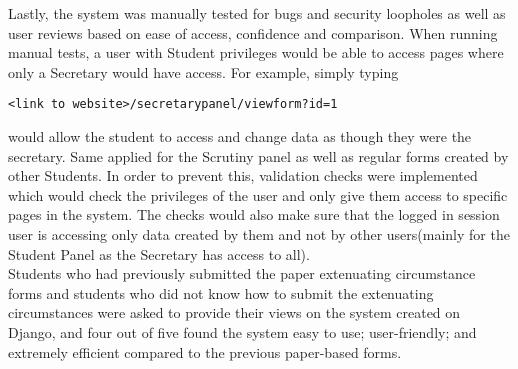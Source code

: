 \documentclass[../main.tex]{subfiles}
\begin{document}
Lastly, the system was manually tested for bugs and security loopholes as well as user reviews based on ease of access, confidence and comparison.
When running manual tests, a user with Student privileges would be able to access pages where only a Secretary would have access. For example, simply typing 
\begin{verbatim}
<link to website>/secretarypanel/viewform?id=1
\end{verbatim} 
would allow the student to access and change data as though they were the secretary. Same applied for the Scrutiny panel as well as regular forms created by other Students. In order to prevent this, validation checks were implemented which would check the privileges of the user and only give them access to specific pages in the system. The checks would also make sure that the logged in session user is accessing only data created by them and not by other users(mainly for the Student Panel as the Secretary has access to all). \\
Students who had previously submitted the paper extenuating circumstance forms and students who did not know how to submit the extenuating circumstances were asked to provide their views on the system created on Django, and four out of five found the system easy to use; user-friendly; and extremely efficient compared to the previous paper-based forms. 
\end{document}
